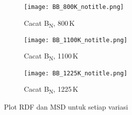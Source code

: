 \begin{figure}[H]\ContinuedFloat
  \centering
  \begin{subfigure}{0.9\textwidth}
    \centering
    \texttt{[image: BB\_800K\_notitle.png]}
    \caption{Cacat B\textsubscript{N}, 800 K}
    \label{subfig:rdf_msd_bb_800k}
  \end{subfigure}
  \vspace{1em}
  \begin{subfigure}{0.9\textwidth}
    \centering
    \texttt{[image: BB\_1100K\_notitle.png]}
    \caption{Cacat B\textsubscript{N}, 1100 K}
    \label{subfig:rdf_msd_bb_1100k}
  \end{subfigure}
  \vspace{1em}
  \begin{subfigure}{0.9\textwidth}
    \centering
    \texttt{[image: BB\_1225K\_notitle.png]}
    \caption{Cacat B\textsubscript{N}, 1225 K}
    \label{subfig:rdf_msd_bb_1225k}
  \end{subfigure}
    \caption{Plot RDF dan MSD untuk setiap variasi}
\end{figure}
